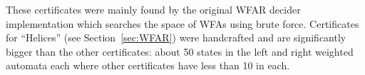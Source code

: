 These certificates were mainly found by the original WFAR decider implementation \cite{iijil1_2025_14914502} which searches the space of WFAs using brute force. Certificates for ``Helices'' (see Section~\ref{sec:WFAR}) were handcrafted and are significantly bigger than the other certificates: about 50 states in the left and right weighted automata each where other certificates have less than 10 in each.

\enlargethispage{\baselineskip}